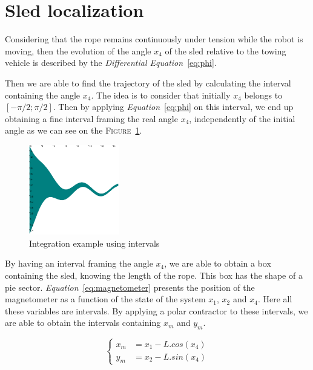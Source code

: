 \section*{Sled localization}
    Considering that the rope remains continuously under tension while the robot is moving, then the evolution of the angle $x_4$ of the sled relative to the towing vehicle is described by the \textit{Differential Equation}~\ref{eq:phi}.

    Then we are able to find the trajectory of the sled by calculating the interval containing the angle $x_4$. The idea is to consider that initially $x_4$ belongs to $[-\pi/2; \pi/2]$. Then by applying \textit{Equation}~\ref{eq:phi} on this interval, we end up obtaining a fine interval framing the real angle $x_4$, independently of the initial angle as we can see on the \textsc{Figure}~\ref{fig:integration}.

    \begin{figure}[!htb]
        \centering
        \includegraphics[width=0.35\textwidth]{imgs/integration_example.png}
        \caption{\label{fig:integration} Integration example using intervals}
    \end{figure}

    By having an interval framing the angle $x_4$, we are able to obtain a box containing the sled, knowing the length of the rope.
    This box has the shape of a pie sector. \textit{Equation}~\ref{eq:magnetometer} presents the position of the magnetometer as a function of the state of the system $x_1$, $x_2$ and $x_4$. Here all these variables are intervals. By applying a polar contractor to these intervals, we are able to obtain the intervals containing $x_m$ and $y_m$.

    \begin{equation}\label{eq:magnetometer}
        \left\lbrace
            \begin{aligned}
                x_m &= x_1 - L.cos(x_4) \\
                y_m &= x_2 - L.sin(x_4)
            \end{aligned}
        \right.
    \end{equation}